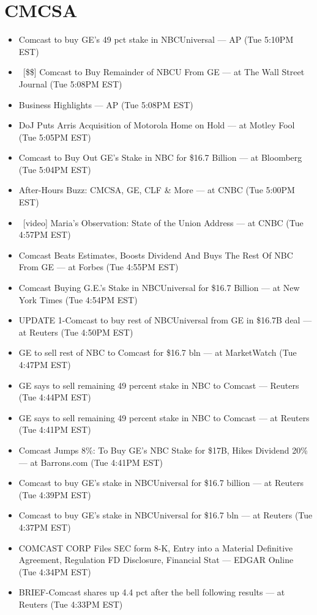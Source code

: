 \documentclass[11pt,asymmetric]{article}
\begin{document}
\section*{CMCSA}
\begin{itemize}
\item Comcast to buy GE's 49 pct stake in NBCUniversal --- AP (Tue 5:10PM EST)
\item\ [\$\$] Comcast to Buy Remainder of NBCU From GE --- at The Wall Street Journal (Tue 5:08PM EST)
\item Business Highlights --- AP (Tue 5:08PM EST)
\item DoJ Puts Arris Acquisition of Motorola Home on Hold --- at Motley Fool (Tue 5:05PM EST)
\item Comcast to Buy Out GE’s Stake in NBC for \$16.7 Billion --- at Bloomberg (Tue 5:04PM EST)
\item After-Hours Buzz: CMCSA, GE, CLF \& More --- at CNBC (Tue 5:00PM EST)
\item\ [video] Maria's Observation: State of the Union Address --- at CNBC (Tue 4:57PM EST)
\item Comcast Beats Estimates, Boosts Dividend And Buys The Rest Of NBC From GE --- at Forbes (Tue 4:55PM EST)
\item Comcast Buying G.E.'s Stake in NBCUniversal for \$16.7 Billion --- at New York Times (Tue 4:54PM EST)
\item UPDATE 1-Comcast to buy rest of NBCUniversal from GE in \$16.7B deal --- at Reuters (Tue 4:50PM EST)
\item GE to sell rest of NBC to Comcast for \$16.7 bln --- at MarketWatch (Tue 4:47PM EST)
\item GE says to sell remaining 49 percent stake in NBC to Comcast --- Reuters (Tue 4:44PM EST)
\item GE says to sell remaining 49 percent stake in NBC to Comcast --- at Reuters (Tue 4:41PM EST)
\item Comcast Jumps 8\%: To Buy GE's NBC Stake for \$17B, Hikes Dividend 20\% --- at Barrons.com (Tue 4:41PM EST)
\item Comcast to buy GE's stake in NBCUniversal for \$16.7 billion --- at Reuters (Tue 4:39PM EST)
\item Comcast to buy GE's stake in NBCUniversal for \$16.7 bln --- at Reuters (Tue 4:37PM EST)
\item COMCAST CORP Files SEC form 8-K, Entry into a Material Definitive Agreement, Regulation FD Disclosure, Financial Stat --- EDGAR Online (Tue 4:34PM EST)
\item BRIEF-Comcast shares up 4.4 pct after the bell following results --- at Reuters (Tue 4:33PM EST)

\end{itemize}
\end{document}
